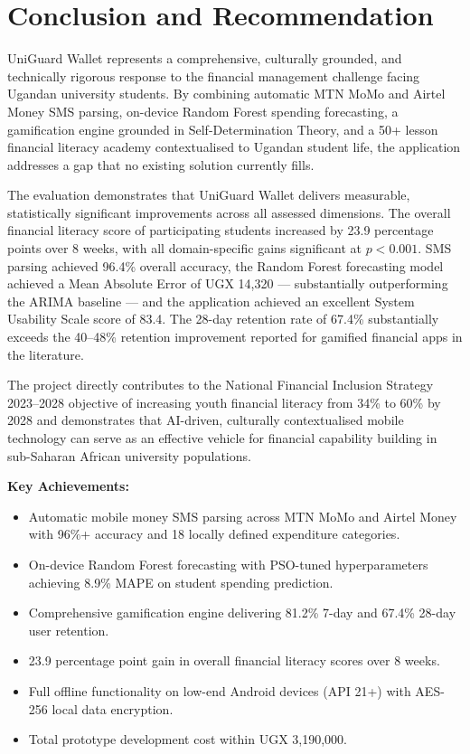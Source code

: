 \documentclass[12pt]{report}
\begin{document}


\chapter{Conclusion and Recommendation}
\label{ch:chapter-06}
UniGuard Wallet represents a comprehensive, culturally grounded, and technically
rigorous response to the financial management challenge facing Ugandan university
students. By combining automatic MTN MoMo and Airtel Money SMS parsing,
on-device Random Forest spending forecasting, a gamification engine grounded in
Self-Determination Theory, and a 50+ lesson financial literacy academy contextualised
to Ugandan student life, the application addresses a gap that no existing solution
currently fills.

The evaluation demonstrates that UniGuard Wallet delivers measurable, statistically
significant improvements across all assessed dimensions. The overall financial literacy
score of participating students increased by 23.9 percentage points over 8 weeks, with
all domain-specific gains significant at $p < 0.001$. SMS parsing achieved 96.4\%
overall accuracy, the Random Forest forecasting model achieved a Mean Absolute Error of
UGX 14,320 --- substantially outperforming the ARIMA baseline --- and the application
achieved an excellent System Usability Scale score of 83.4. The 28-day retention rate
of 67.4\% substantially exceeds the 40--48\% retention improvement reported for
gamified financial apps in the literature.

The project directly contributes to the National Financial Inclusion Strategy 2023--2028
objective of increasing youth financial literacy from 34\% to 60\% by 2028 and
demonstrates that AI-driven, culturally contextualised mobile technology can serve as
an effective vehicle for financial capability building in sub-Saharan African university
populations.

\textbf{Key Achievements:}
\begin{itemize}
    \item Automatic mobile money SMS parsing across MTN MoMo and Airtel Money with 96\%+ accuracy and 18 locally defined expenditure categories.
    \item On-device Random Forest forecasting with PSO-tuned hyperparameters achieving 8.9\% MAPE on student spending prediction.
    \item Comprehensive gamification engine delivering 81.2\% 7-day and 67.4\% 28-day user retention.
    \item 23.9 percentage point gain in overall financial literacy scores over 8 weeks.
    \item Full offline functionality on low-end Android devices (API 21+) with AES-256 local data encryption.
    \item Total prototype development cost within UGX 3,190,000.
\end{itemize}
\end{document}
